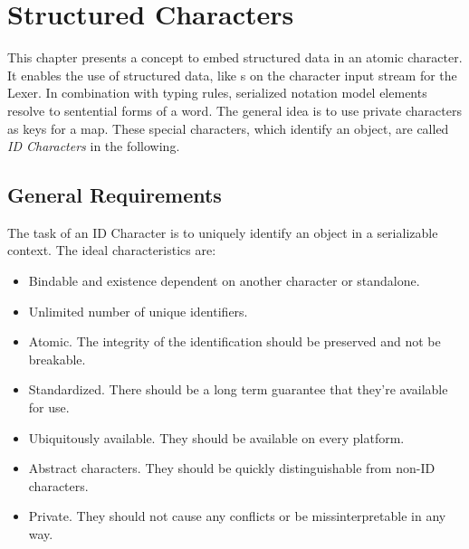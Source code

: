 \section{Structured Characters}
This chapter presents a concept to embed structured data in an atomic character. It enables the use of structured data, like s on the character input stream for the Lexer. In combination with typing rules, serialized notation model elements resolve to sentential forms of a word. The general idea is to use private characters as keys for a map. These special characters, which identify an object, are called \emph{ID Characters} in the following.

\subsection{General Requirements}
The task of an ID Character is to uniquely identify an object in a serializable context. 
The ideal characteristics are:
\begin{itemize}
	\item Bindable and existence dependent on another character or standalone.
	\item Unlimited number of unique identifiers.
	\item Atomic. The integrity of the identification should be preserved and not be breakable.
	\item Standardized. There should be a long term guarantee that they're available for use.
	\item Ubiquitously available. They should be available on every platform.
	\item Abstract characters. They should be quickly distinguishable from non-ID characters.
	\item Private. They should not cause any conflicts or be missinterpretable in any way.
\end{itemize}

